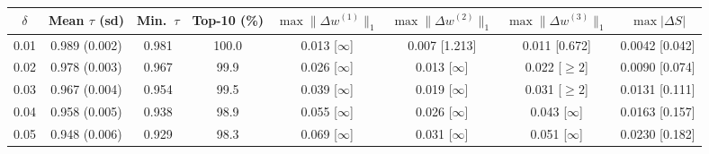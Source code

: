 \begin{tabular}{cccccccc}
\toprule
$\delta$ & Mean $\tau$ (sd) & Min.\ $\tau$ & Top-10 (\%) & $\max\|\Delta w^{(1)}\|_1$ & $\max\|\Delta w^{(2)}\|_1$ & $\max\|\Delta w^{(3)}\|_1$ & $\max|\Delta S|$ \\
\midrule
0.01 & 0.989 (0.002) & 0.981 & 100.0 & 0.013 [$\infty$] & 0.007 [1.213] & 0.011 [0.672] & 0.0042 [0.042] \\
0.02 & 0.978 (0.003) & 0.967 & 99.9 & 0.026 [$\infty$] & 0.013 [$\infty$] & 0.022 [$\geq2$] & 0.0090 [0.074] \\
0.03 & 0.967 (0.004) & 0.954 & 99.5 & 0.039 [$\infty$] & 0.019 [$\infty$] & 0.031 [$\geq2$] & 0.0131 [0.111] \\
0.04 & 0.958 (0.005) & 0.938 & 98.9 & 0.055 [$\infty$] & 0.026 [$\infty$] & 0.043 [$\infty$] & 0.0163 [0.157] \\
0.05 & 0.948 (0.006) & 0.929 & 98.3 & 0.069 [$\infty$] & 0.031 [$\infty$] & 0.051 [$\infty$] & 0.0230 [0.182] \\
\bottomrule
\end{tabular}
